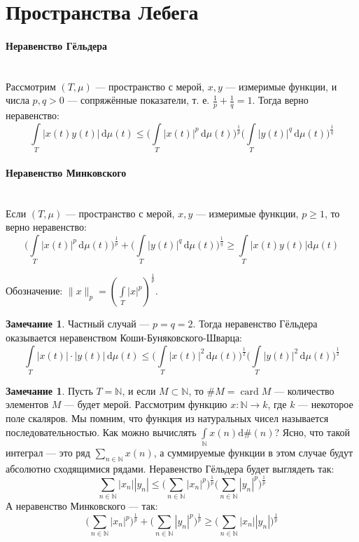 \documentclass[11pt,openany,a4paper]{scrartcl}
\theoremstyle{plain}
\theoremstyle{definition}
\newtheorem{remark}[theorem]{Замечание}
\newcommand\mb{\mathbb}
\newcommand\lparagraph[1]{\paragraph{#1}\mbox{}\\}
\newcommand{\dif}{\, \mathrm d}
\DeclareMathOperator{\card}{card}
\begin{document}
\section{Пространства Лебега}

\lparagraph{Неравенство Гёльдера}

Рассмотрим $(T, \mu)$ — пространство с мерой, $x, y$ — измеримые функции, и числа
$p, q > 0$ — сопряжённые показатели, т. е. $\frac{1}{p} + \frac{1}{q} = 1$. 
Тогда верно неравенство:
$$
\int\limits_T |x(t)y(t)|\dif \mu(t) \leqslant
\bigg(\int\limits_T |x(t)|^p\dif \mu(t)\bigg)^{\frac{1}{p}}
\bigg(\int\limits_T |y(t)|^q\dif \mu(t)\bigg)^\frac{1}{q}
$$

\lparagraph{Неравенство Минковского}

Если $(T, \mu)$ — пространство с мерой, $x, y$ — измеримые функции,
$p \geqslant 1$, то верно неравенство:
$$
\bigg(\int\limits_T |x(t)|^p\dif \mu(t)\bigg)^{\frac{1}{p}} +
\bigg(\int\limits_T |y(t)|^q\dif \mu(t)\bigg)^\frac{1}{q} \geqslant
\int\limits_T |x(t)y(t)|\mathrm d\mu(t)
$$

Обозначение: $\|x\|_p = (\int\limits_T |x|^p)^\frac{1}{p}$.

\begin{remark}
    Частный случай — $p = q = 2$. Тогда неравенство Гёльдера оказывается
    неравенством Коши-Буняковского-Шварца:
    $$
    \int\limits_T |x(t)|\cdot|y(t)|\dif \mu(t) \leqslant
    \bigg(\int\limits_T |x(t)|^2\dif \mu(t)\bigg)^{\frac{1}{2}}
    \bigg(\int\limits_T |y(t)|^2\dif\mu(t)\bigg)^\frac{1}{2}
    $$
\end{remark}
\begin{remark}
    Пусть $T = \mb N$, и если $M \subset \mb N$,
    то $\#M = \card M$ — количество элементов $M$ — будет мерой.
    Рассмотрим функцию $x: \mb N \to k$, где $k$ — некоторое поле скаляров.
    Мы помним, что функция из натуральных чисел называется последовательностью.
    Как можно вычислять $\int\limits_{\mb N}x(n)\mathrm d\#(n)$? Ясно,
    что такой интеграл — это ряд $\sum\limits_{n \in \mb N} x(n)$, а суммируемые 
    функции в этом случае будут абсолютно сходящимися рядами.
    Неравенство Гёльдера будет выглядеть так:
    $$
    \sum_{n \in \mb N} |x_n||y_n| \leqslant
    \bigg(\sum_{n \in \mb N} |x_n|^p\bigg)^\frac{1}{p}
    \bigg(\sum_{n \in \mb N} |y_n|^p\bigg)^\frac{1}{p}
    $$
    А неравенство Минковского — так:
    $$
    \bigg(\sum_{n \in \mb N} |x_n|^p\bigg)^\frac{1}{p} +
    \bigg(\sum_{n \in \mb N} |y_n|^p\bigg)^\frac{1}{p} \geqslant
    \bigg(\sum_{n \in \mb N} |x_n||y_n|\bigg)^\frac{1}{p}
    $$
\end{remark}
\end{document}
